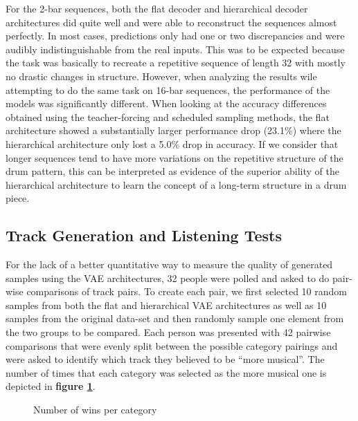 \documentclass[10pt,twocolumn]{article}
\begin{document}
For the 2-bar sequences, both the flat decoder and hierarchical decoder architectures did quite well and were able to reconstruct the sequences almost perfectly. In most cases, predictions only had one or two discrepancies and were audibly indistinguishable from the real inputs. This was to be expected because the task was basically to recreate a repetitive sequence of length 32 with mostly no drastic changes in structure. However, when analyzing the results wile attempting to do the same task on 16-bar sequences, the performance of the models was significantly different. When looking at the accuracy differences obtained using the teacher-forcing and scheduled sampling methods, the flat architecture showed a substantially larger performance drop (23.1\%) where the hierarchical architecture only lost a 5.0\% drop in accuracy. If we consider that longer sequences tend to have more variations on the repetitive structure of the drum pattern, this can be interpreted as evidence of the superior ability of the hierarchical architecture to learn the concept of a long-term structure in a drum piece.

\subsection{Track Generation and Listening Tests}
For the lack of a better quantitative way to measure the quality of generated samples using the VAE architectures, 32 people were polled and asked to do pair-wise comparisons of track pairs. To create each pair, we first selected 10 random samples from both the flat and hierarchical VAE architectures as well as 10 samples from the original data-set and then randomly sample one element from the two groups to be compared. Each person was presented with 42 pairwise comparisons that were evenly split between the possible category pairings and were asked to identify which track they believed to be ``more musical''. The number of times that each category was selected as the more musical one is depicted in \textbf{figure \ref{fig:num_wins}}.

\begin{figure}[H]
  \caption{Number of wins per category}
  \label{fig:num_wins}
\end{figure}
\end{document}
